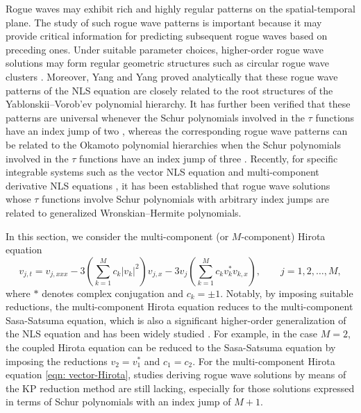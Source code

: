 \documentclass[preprint,3p,10pt]{elsarticle}
\theoremstyle{definition}
\begin{document}
Rogue waves may exhibit rich and highly regular patterns on the spatial-temporal plane. The study of such rogue wave patterns is important because it may provide critical information for predicting subsequent rogue waves based on preceding ones. Under suitable parameter choices, higher-order rogue wave solutions may form regular geometric structures such as circular rogue wave clusters \cite{kedziora2011circular}. Moreover, Yang and Yang proved analytically that these rogue wave patterns of the NLS equation are closely related to the root structures of the Yablonskii--Vorob'ev polynomial hierarchy. It has further been verified that these patterns are universal whenever the Schur polynomials involved in the $\tau$ functions have an index jump of two \cite{yang2021universal}, whereas the corresponding rogue wave patterns can be related to the Okamoto polynomial hierarchies when the Schur polynomials involved in the $\tau$ functions have an index jump of three \cite{yang2023rogue}. Recently, for specific integrable systems such as the vector NLS equation \cite{zhang2022rogue} and multi-component derivative NLS equations \cite{lin2024rogue}, it has been established that rogue wave solutions whose $\tau$ functions involve Schur polynomials with arbitrary index jumps are related to generalized Wronskian--Hermite polynomials.


In this section, we consider the multi-component (or \(M\)-component) Hirota equation
\begin{equation}
\label{eqn: vector-Hirota}
v_{j,t}
=
v_{j,xxx}
-3\left(\sum_{k=1}^{M} c_k |v_k|^2 \right) v_{j,x}
-3 v_j \left(\sum_{k=1}^{M} c_k v_k^{*} v_{k,x}\right),
\qquad j=1,2,\ldots,M,
\end{equation}
where \(*\) denotes complex conjugation and \(c_k=\pm1\).
Notably, by imposing suitable reductions, the multi-component Hirota equation reduces to the multi-component Sasa-Satsuma equation, which is also a significant higher-order generalization of the NLS equation and has been widely studied \cite{zhang2025dark,liu2023painleve}.
For example, in the case \(M=2\), the coupled Hirota equation can be reduced to the Sasa-Satsuma equation by imposing the reductions \(v_2=v_1^*\) and \(c_1=c_2\).
For the multi-component Hirota equation \eqref{eqn: vector-Hirota}, studies deriving rogue wave solutions by means of the KP reduction method are still lacking, especially for those solutions expressed in terms of Schur polynomials with an index jump of \(M+1\). 
\end{document}
